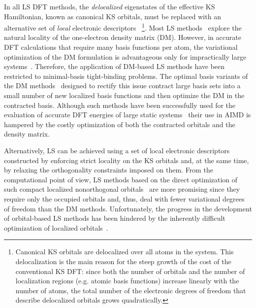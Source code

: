 \documentclass[aps,prl,reprint,amsmath,amssymb]{revtex4-1}
\begin{document}
In all LS DFT methods, the \emph{delocalized} eigenstates of the effective KS Hamiltonian, known as canonical KS orbitals, must be replaced with an alternative set of \emph{local} electronic descriptors
~\footnote{Canonical KS orbitals are delocalized over all atoms in the system. 
This delocalization is the main reason for the steep growth of the cost of the conventional KS DFT: since both the number of orbitals and the number of localization regions (e.g. atomic basis functions) increase linearly with the number of atoms, the total number of the electronic degrees of freedom that describe delocalized orbitals grows quadratically.}. 
Most LS methods~\cite{a:linscale3,a:lee-yang-1996,a:ls-scuseria-1997,a:ls-manolopoulos-1998,a:ls-helgaker-2001,a:ls-niklasson-2003,a:curvy2,a:ls-dm-sign} explore the natural locality of the one-electron density matrix (DM). 
However, in accurate DFT calculations that require many basis functions per atom, the variational optimization of the DM formulation is advantageous only for impractically large systems~\cite{a:ls-rev-1999,a:ls-dm-sign,a:almo-ls}.
Therefore, the application of DM-based LS methods have been restricted to minimal-basis tight-binding problems. 
The optimal basis variants of the DM methods~\cite{a:ls-stechel-1994,a:ls-gillan-1995,a:ls-gillan-1996,a:ls-onetep-2003} designed to rectify this issue contract large basis sets into a small number of new localized basis functions and then optimize the DM in the contracted basis. 
Although such methods have been successfully used for the evaluation of accurate DFT energies of large static systems~\cite{a:ls-onetep-2009,a:ls-conquest-2010,a:ls-onetep-2010-app1,a:ls-rev-2012} their use in AIMD is hampered by the costly optimization of both the contracted orbitals and the density matrix.

Alternatively, LS can be achieved using a set of local electronic descriptors constructed by enforcing strict locality on the KS orbitals and, at the same time, by relaxing the orthogonality constraints imposed on them. 
From the computational point of view, LS methods based on the direct optimization of such compact localized nonorthogonal orbitals~\cite{a:ls-galli-parrinello-1992,a:ls-mauri-galli-car-1993,a:ls-ordejon-1993,a:ls-mauri-galli-1994,a:ls-ordejon-1995,a:ls-kim-mauri-galli-1995,a:ls-fattebert-2004,a:ls-fattebert-2006,a:burger-yang-2008} are more promising since they require only the occupied orbitals and, thus, deal with fewer variational degrees of freedom than the DM methods. 
Unfortunately, the progress in the development of orbital-based LS methods has been hindered by the inherently difficult optimization of localized orbitals~\cite{a:ls-mauri-galli-car-1993,a:ls-ordejon-1995,a:ls-fattebert-2004,a:ls-rev-1999,a:weitao-yang-2013}. 
\end{document}
